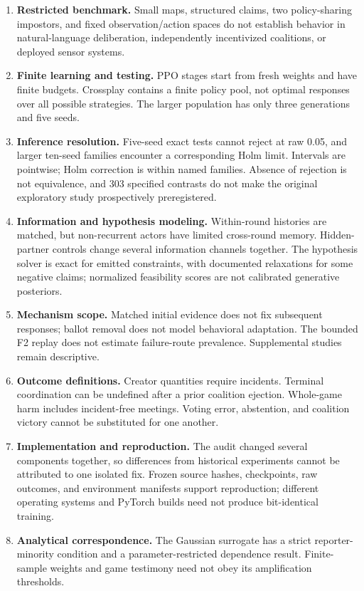 \documentclass[
  12pt,
]{article}
\providecommand{\tightlist}{%
  \setlength{\itemsep}{0pt}\setlength{\parskip}{0pt}}
\begin{document}
\begin{enumerate}
\def\labelenumi{\arabic{enumi}.}
\tightlist
\item
  \textbf{Restricted benchmark.} Small maps, structured claims, two
  policy-sharing impostors, and fixed observation/action spaces do not
  establish behavior in natural-language deliberation, independently
  incentivized coalitions, or deployed sensor systems.
\item
  \textbf{Finite learning and testing.} PPO stages start from fresh
  weights and have finite budgets. Crossplay contains a finite policy
  pool, not optimal responses over all possible strategies. The larger
  population has only three generations and five seeds.
\item
  \textbf{Inference resolution.} Five-seed exact tests cannot reject at
  raw 0.05, and larger ten-seed families encounter a corresponding Holm
  limit. Intervals are pointwise; Holm correction is within named
  families. Absence of rejection is not equivalence, and 303 specified
  contrasts do not make the original exploratory study prospectively
  preregistered.
\item
  \textbf{Information and hypothesis modeling.} Within-round histories
  are matched, but non-recurrent actors have limited cross-round memory.
  Hidden-partner controls change several information channels together.
  The hypothesis solver is exact for emitted constraints, with
  documented relaxations for some negative claims; normalized
  feasibility scores are not calibrated generative posteriors.
\item
  \textbf{Mechanism scope.} Matched initial evidence does not fix
  subsequent responses; ballot removal does not model behavioral
  adaptation. The bounded F2 replay does not estimate failure-route
  prevalence. Supplemental studies remain descriptive.
\item
  \textbf{Outcome definitions.} Creator quantities require incidents.
  Terminal coordination can be undefined after a prior coalition
  ejection. Whole-game harm includes incident-free meetings. Voting
  error, abstention, and coalition victory cannot be substituted for one
  another.
\item
  \textbf{Implementation and reproduction.} The audit changed several
  components together, so differences from historical experiments cannot
  be attributed to one isolated fix. Frozen source hashes, checkpoints,
  raw outcomes, and environment manifests support reproduction;
  different operating systems and PyTorch builds need not produce
  bit-identical training.
\item
  \textbf{Analytical correspondence.} The Gaussian surrogate has a
  strict reporter-minority condition and a parameter-restricted
  dependence result. Finite-sample weights and game testimony need not
  obey its amplification thresholds.
\end{enumerate}
\end{document}
